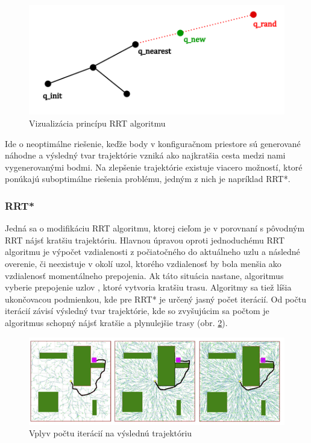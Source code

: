 \begin{figure}[h]
	\centering
	\includegraphics[width=120mm]{img/RRT1.png}
	\caption{Vizualizácia princípu RRT algoritmu }\label{OBRAZOK 1.2.1} 
\end{figure}  

Ide o neoptimálne riešenie, keďže body v konfiguračnom priestore sú generované náhodne a výsledný tvar trajektórie vzniká ako najkratšia cesta medzi nami vygenerovanými bodmi. Na zlepšenie trajektórie existuje viacero možností, ktoré ponúkajú suboptimálne riešenia problému, jedným z nich je napríklad RRT*.  

\subsubsection{RRT*}
\label{kap:1.2.2}

Jedná sa o modifikáciu RRT algoritmu, ktorej cieľom je v porovnaní s pôvodným RRT nájsť kratšiu trajektóriu. Hlavnou úpravou oproti jednoduchému RRT algoritmu je výpočet vzdialenosti z počiatočného do aktuálneho uzlu a následné overenie, či neexistuje v okolí uzol, ktorého vzdialenosť by bola menšia ako vzdialenosť momentálneho prepojenia. Ak táto situácia nastane, algoritmus vyberie prepojenie uzlov , ktoré vytvoria kratšiu trasu. Algoritmy sa tiež líšia ukončovacou podmienkou, kde pre RRT* je určený jasný počet iterácií. Od počtu iterácií závisí výsledný tvar trajektórie, kde so zvyšujúcim sa počtom je algoritmus schopný nájsť kratšie a plynulejšie trasy (obr. \ref{OBRAZOK 1.2.2}).

\begin{figure}[h]
	\centering
	\includegraphics[width=160mm]{img/RRT2.png}
	\caption{Vplyv počtu iterácií na výslednú trajektóriu \cite{}}\label{OBRAZOK 1.2.2} 
\end{figure} 

